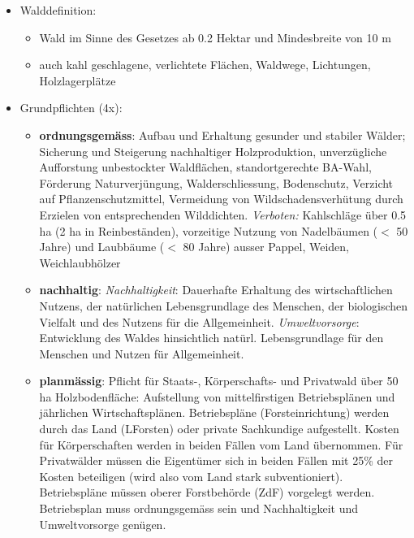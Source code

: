 \documentclass{article}
\begin{document}
\begin{itemize}

	\item Walddefinition:
	
		\begin{itemize}
		  \item Wald im Sinne des Gesetzes ab 0.2 Hektar und Mindesbreite von 10 m
		  \item auch kahl geschlagene, verlichtete Flächen, Waldwege, Lichtungen, Holzlagerplätze
		\end{itemize}


	\item Grundpflichten (4x): 
	
		\begin{itemize}
			
			\item \textbf{ordnungsgemäss}: Aufbau und Erhaltung gesunder und stabiler Wälder; Sicherung und Steigerung nachhaltiger Holzproduktion, unverzügliche Aufforstung unbestockter Waldflächen, standortgerechte BA-Wahl, Förderung Naturverjüngung, Walderschliessung, Bodenschutz, Verzicht auf Pflanzenschutzmittel, Vermeidung von Wildschadensverhütung durch Erzielen von entsprechenden Wilddichten. \textit{Verboten:} Kahlschläge über 0.5 ha (2 ha in Reinbeständen), vorzeitige Nutzung von Nadelbäumen ($<$ 50 Jahre) und Laubbäume ($<$ 80 Jahre) ausser Pappel, Weiden, Weichlaubhölzer
			
			\item \textbf{nachhaltig}: \textit{Nachhaltigkeit}: Dauerhafte Erhaltung des wirtschaftlichen Nutzens, der natürlichen Lebensgrundlage des Menschen, der biologischen Vielfalt und des Nutzens für die Allgemeinheit. \textit{Umweltvorsorge}: Entwicklung des Waldes hinsichtlich natürl. Lebensgrundlage für den Menschen und Nutzen für Allgemeinheit.
			
			\item \textbf{planmässig}: Pflicht für Staats-, Körperschafts- und Privatwald über 50 ha Holzbodenfläche: Aufstellung von mittelfirstigen Betriebsplänen und jährlichen Wirtschaftsplänen. Betriebspläne (Forsteinrichtung) werden durch das Land (LForsten) oder private Sachkundige aufgestellt. Kosten für Körperschaften werden in beiden Fällen vom Land übernommen. Für Privatwälder müssen die Eigentümer sich in beiden Fällen mit 25\% der Kosten beteiligen (wird also vom Land stark subventioniert). Betriebspläne müssen oberer Forstbehörde (ZdF) vorgelegt werden. Betriebsplan muss ordnungsgemäss sein und Nachhaltigkeit und Umweltvorsorge genügen.
			

\end{itemize}
\end{itemize}
\end{document}
